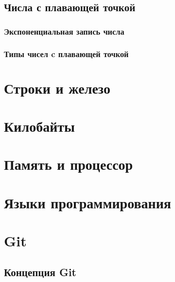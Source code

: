\documentclass[
  letterpaper,
  DIV=11,
  numbers=noendperiod]{scrreprt}
\theoremstyle{definition}
\theoremstyle{remark}
\begin{document}
\section{Числа с плавающей точкой}\label{float_iron}

\subsection{Экспоненциальная запись числа}\label{scientific_notation}

\subsection{Типы чисел c плавающей точкой}\label{float_types}


\chapter{Строки и железо}\label{appendix_strings}


\chapter{Килобайты}\label{appendix_kilobytes}


\chapter{Память и процессор}\label{appendix_memory}


\chapter{Языки программирования}\label{appendix_proglang}


\chapter{Git}\label{appendix_git}

\section{Концепция
Git}\label{ux43aux43eux43dux446ux435ux43fux446ux438ux44f-git}
\end{document}
